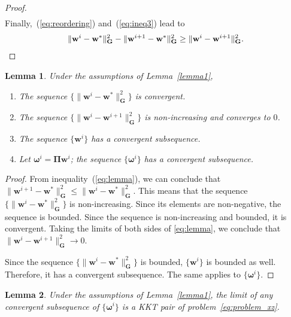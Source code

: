 \documentclass[10pt,twocolumn,twoside]{IEEEtran}
\newcommand{\wt}{\mathbf{w}} %
\newcommand{\G}{\mathbf{G}} %
\newtheorem{lemma}{Lemma}
\begin{document}
\begin{proof}
\begin{align}
	\end{align}
	Finally,~(\ref{eq:reordering}) and~(\ref{eq:ineq3}) lead to
	\begin{equation*}
	\begin{aligned}
	\|\wt^i - \wt^*\|^2_{\G} - \|\wt^{i+1} - \wt^*\|^2_{\G} \geq  \|\wt^i - \wt^{i+1}\|^2_{\G}.
	\qedhere
	\end{aligned}
	\end{equation*}
\end{proof}

\begin{lemma}  \label{lemma3}
	Under the assumptions of Lemma~\ref{lemma1},
	\begin{enumerate}
		\item The sequence $\{\| \wt^i - \wt^* \|^2_{\G}\}$ is convergent.

		\item The sequence $\{\| \wt^i - \wt^{i+1} \|^2_{\G}\}$ is non-increasing and converges to $0$.

		\item The sequence $\{\wt^i\}$ has a convergent subsequence.

		\item Let $\bm{\omega}^i = \bm{\Pi} \wt^i$; the sequence $\{\bm{\omega}^i\}$ has a convergent subsequence.
	\end{enumerate}
\end{lemma}

\begin{proof}
	From inequality~(\ref{eq:lemma}), we can conclude that $\| \wt^{i+1} - \wt^{*} \|^2_{\G} \leq \| \wt^i - \wt^{*} \|^2_{\G}$. This means that the sequence $\{\| \wt^i - \wt^{*} \|^2_{\G}\}$ is non-increasing. Since its elements are non-negative, the sequence is bounded.	Since the sequence is non-increasing and bounded, it is convergent. Taking the limits of both sides of \eqref{eq:lemma}, we conclude that $\| \wt^i - \wt^{i+1} \|^2_{\G} \to 0$.

	Since the sequence $\{\| \wt^i - \wt^{*} \|^2_{\G}\}$ is bounded, $\{\wt^i\}$ is bounded as well. Therefore, it has a convergent subsequence. The same applies to $\{\bm{\omega}^i\}$.
\end{proof}

\begin{lemma} \label{lemma4}
	Under the assumptions of Lemma~\ref{lemma1}, the limit of any convergent subsequence of $\{\bm{\omega}^i\}$ is a KKT pair of problem~\eqref{eq:problem_xz}.
\end{lemma}
\end{document}
